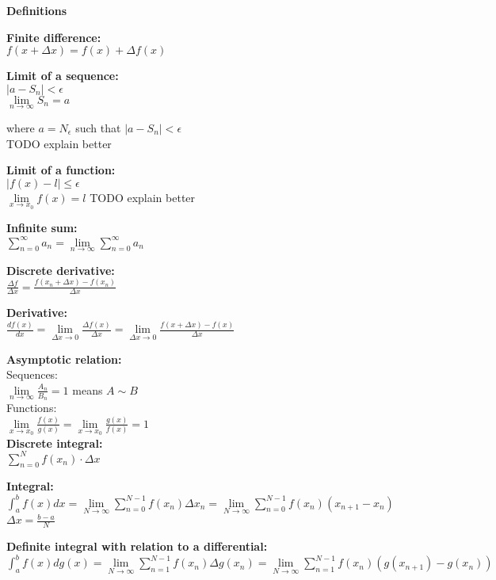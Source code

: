 \documentclass[12pt,a4paper]{report}
\begin{document}
	
	\begin{center}\textbf{Definitions}\end{center}
	
	\textbf{Finite difference:}\\
	$f(x + \Delta x) = f(x) + \Delta f(x)$
	
	\textbf{Limit of a sequence:}\\	
	$|a - S_n| < \epsilon$\\
	$\lim\limits_{n \to \infty} S_n = a$
	
	where $a = N_\epsilon$ such that $|a - S_n| < \epsilon$\\
	TODO explain better

	\textbf{Limit of a function:}\\
	$|f(x) - l| \leq \epsilon$\\
	$\lim\limits_{x \to x_0} f(x) = l$
	TODO explain better
	
	\textbf{Infinite sum:}\\
	$\sum_{n = 0}^{\infty} a_n = \lim\limits_{n \to \infty} \sum_{n = 0}^{\infty} a_n$
	
	\textbf{Discrete derivative:}\\
	$\frac{\Delta f}{\Delta x} = \frac{f(x_n + \Delta x) - f(x_n)}{\Delta x}$
	
	\textbf{Derivative:}\\
	$\frac{df(x)}{dx} = \lim\limits_{\Delta x \to 0} \frac{\Delta f(x)}{\Delta x} = \lim\limits_{\Delta x \to 0} \frac{f(x + \Delta x) - f(x)}{\Delta x}$
	
	\textbf{Asymptotic relation:}\\
	Sequences:\\
	$\lim\limits_{n \to \infty} \frac{A_n}{B_n} = 1$ means $A \sim B$\\
	Functions:\\
	$\lim\limits_{x \to x_0} \frac{f(x)}{g(x)} = \lim\limits_{x \to x_0} \frac{g(x)}{f(x)} = 1$\\
	
	\textbf{Discrete integral:}\\
	$\sum_{n = 0}^{N} f(x_n) \cdot \Delta x$
	
	\textbf{Integral:}\\
	$\int_{a}^{b} f(x) dx = \lim\limits_{N \to \infty} \sum_{n = 0}^{N - 1} f(x_n) \Delta x_n = \lim\limits_{N \to \infty} \sum_{n = 0}^{N - 1} f(x_n)(x_{n+1} - x_n)$\\
	$\Delta x = \frac{b - a}{N}$
	
	\textbf{Definite integral with relation to a differential:}\\
	$\int_{a}^{b} f(x)dg(x) = \lim\limits_{N \to \infty} \sum_{n = 1}^{N - 1} f(x_n)\Delta g(x_n) = \lim\limits_{N \to \infty} \sum_{n = 1}^{N - 1} f(x_n)(g(x_{n+1}) - g(x_n))$
	
\end{document}

